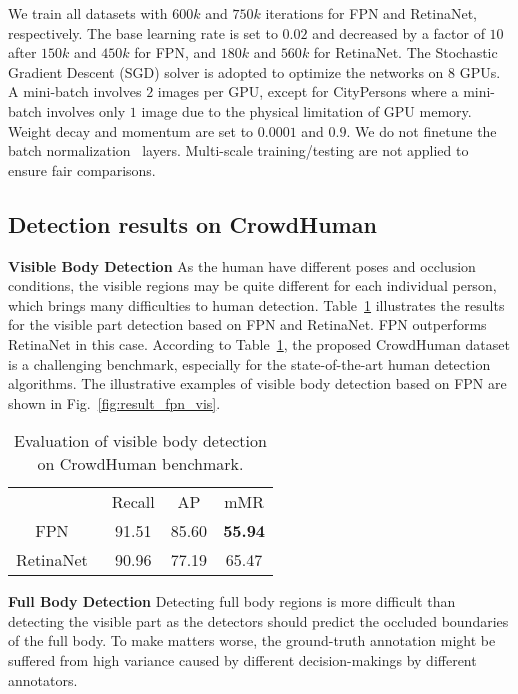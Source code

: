 \documentclass[10pt,twocolumn,letterpaper]{article}
\newcommand{\myparagraph}[1]{{\vspace{0.5em} \noindent \bf #1}}
\begin{document}
We train all datasets with $600k$ and $750k$ iterations for FPN and RetinaNet, respectively. The base learning rate is set to $0.02$ and decreased by a factor of $10$ after $150k$ and $450k$ for FPN, and $180k$ and $560k$ for RetinaNet. The Stochastic Gradient Descent (SGD) solver is adopted to optimize the networks on $8$ GPUs. A mini-batch involves $2$ images per GPU, except for CityPersons where a mini-batch involves only $1$ image due to the physical limitation of GPU memory. Weight decay and momentum are set to $0.0001$ and $0.9$. We do not finetune the batch normalization~\cite{ioffe2015batch} layers. Multi-scale training/testing are not applied to ensure fair comparisons. 


\subsection{Detection results on CrowdHuman}
\label{sec:expCrowdhuman}

\myparagraph{Visible Body Detection} As the human have different poses and occlusion conditions, the visible regions may be quite different for each individual person, which brings many difficulties to human detection. Table~\ref{table:evalvis} illustrates the results for the visible part detection based on FPN and RetinaNet. FPN outperforms RetinaNet in this case. According to Table~\ref{table:evalvis}, the proposed CrowdHuman dataset is a challenging benchmark, especially for the state-of-the-art human detection algorithms. The illustrative examples of visible body detection based on FPN are shown in Fig.~\ref{fig:result_fpn_vis}.

\setlength{\tabcolsep}{4pt}
\begin{table}
\begin{center}
\caption{Evaluation of visible body detection on CrowdHuman benchmark.}
\label{table:evalvis}
\begin{tabular}{cccc}
\hline\noalign{\smallskip}
{} & Recall & AP & mMR\\
\noalign{\smallskip}
\hline
\noalign{\smallskip}
FPN~\cite{lin2017feature}  & {91.51} & {85.60} & {\textbf{55.94}}\\
RetinaNet~\cite{lin2017focal} & {90.96} & {77.19} & {65.47}\\
\hline
\end{tabular}
\end{center}
\end{table}
\setlength{\tabcolsep}{1.4pt}


\myparagraph{Full Body Detection} Detecting full body regions is more difficult than detecting the visible part as the detectors should predict the occluded boundaries of the full body. To make matters worse, the ground-truth annotation might be suffered from high variance caused by different decision-makings by different annotators.
\end{document}
